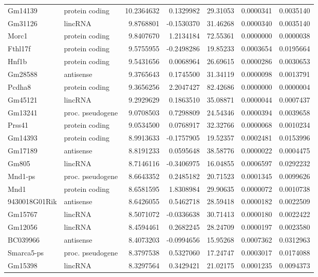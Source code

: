 \documentclass[onehalf,12pt]{beavtex}
\begin{document}
\begin{longtable}{llrrrrr}
  \addlinespace
  Gm14139 & protein coding & 10.2364632 & 0.1329982 & 29.31053 & 0.0000341 & 0.0035140\\
  Gm31126 & lincRNA & 9.8768801 & -0.1530370 & 31.46268 & 0.0000340 & 0.0035140\\
  Morc1 & protein coding & 9.8407670 & 1.2134184 & 72.55361 & 0.0000000 & 0.0000038\\
  Fthl17f & protein coding & 9.5755955 & -0.2498286 & 19.85233 & 0.0003654 & 0.0195664\\
  Hnf1b & protein coding & 9.5431656 & 0.0068964 & 26.69615 & 0.0000286 & 0.0030653\\
  \addlinespace
  Gm28588 & antisense & 9.3765643 & 0.1745500 & 31.34119 & 0.0000098 & 0.0013791\\
  Pcdha8 & protein coding & 9.3656256 & 2.2047427 & 82.42686 & 0.0000000 & 0.0000004\\
  Gm45121 & lincRNA & 9.2929629 & 0.1863510 & 35.08871 & 0.0000044 & 0.0007437\\
  Gm13241 & proc. pseudogene & 9.0708503 & 0.7298809 & 24.54346 & 0.0000394 & 0.0039658\\
  Prss41 & protein coding & 9.0534500 & 0.0768917 & 32.32766 & 0.0000068 & 0.0010234\\
  \addlinespace
  Gm14393 & protein coding & 8.9913633 & -0.1757905 & 19.52357 & 0.0002481 & 0.0153996\\
  Gm17189 & antisense & 8.8191233 & 0.0595648 & 38.58776 & 0.0000022 & 0.0004475\\
  Gm805 & lincRNA & 8.7146116 & -0.3406975 & 16.04855 & 0.0006597 & 0.0292232\\
  Mnd1-ps & proc. pseudogene & 8.6643352 & 0.2485182 & 20.71523 & 0.0001345 & 0.0099626\\
  Mnd1 & protein coding & 8.6581595 & 1.8308984 & 29.90635 & 0.0000072 & 0.0010738\\
  \addlinespace
  9430018G01Rik & antisense & 8.6426055 & 0.5462718 & 28.59418 & 0.0000182 & 0.0022509\\
  Gm15767 & lincRNA & 8.5071072 & -0.0336638 & 30.71413 & 0.0000180 & 0.0022422\\
  Gm12056 & lincRNA & 8.4594461 & 0.2682245 & 28.24709 & 0.0000197 & 0.0023580\\
  BC039966 & antisense & 8.4073203 & -0.0994656 & 15.95268 & 0.0007362 & 0.0312963\\
  Smarca5-ps & proc. pseudogene & 8.3797538 & 0.5327060 & 17.24747 & 0.0003017 & 0.0174088\\
  \addlinespace
  Gm15398 & lincRNA & 8.3297564 & 0.3429421 & 21.02175 & 0.0001235 & 0.0094373\\

\end{longtable}
\end{document}
